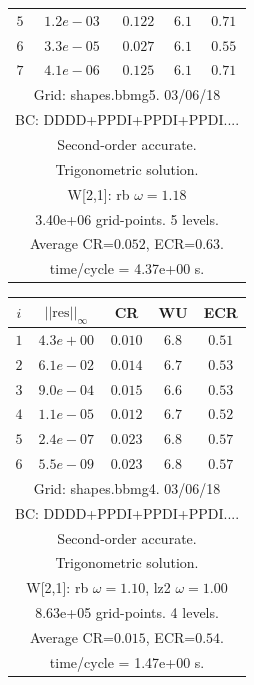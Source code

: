 \begin{table}[hbt]
\begin{center}
{\begin{tabular}{|c|c|c|c|c|}
 $ 5$  & $ 1.2e-03$ & $0.122$ & $ 6.1$ & $0.71$ \\ 
 $ 6$  & $ 3.3e-05$ & $0.027$ & $ 6.1$ & $0.55$ \\ 
 $ 7$  & $ 4.1e-06$ & $0.125$ & $ 6.1$ & $0.71$ \\ 
\hline 
\multicolumn{5}{|c|}{Grid: shapes.bbmg5. 03/06/18}  \\
\multicolumn{5}{|c|}{BC: DDDD+PPDI+PPDI+PPDI....}  \\
\multicolumn{5}{|c|}{Second-order accurate.}  \\
\multicolumn{5}{|c|}{Trigonometric solution.}  \\
\multicolumn{5}{|c|}{W[2,1]: rb $\omega=1.18$}  \\
\multicolumn{5}{|c|}{3.40e+06 grid-points. 5 levels.}  \\
\multicolumn{5}{|c|}{Average CR=$0.052$, ECR=$0.63$.}  \\
\multicolumn{5}{|c|}{time/cycle = 4.37e+00 s.}  \\
\hline 
\end{tabular}
\begin{tabular}{|c|c|c|c|c|} \hline 
 $i$   & $\vert\vert\mbox{res}\vert\vert_\infty$  &  CR     &  WU    & ECR  \\   \hline 
 $ 1$  & $ 4.3e+00$ & $0.010$ & $ 6.8$ & $0.51$ \\ 
 $ 2$  & $ 6.1e-02$ & $0.014$ & $ 6.7$ & $0.53$ \\ 
 $ 3$  & $ 9.0e-04$ & $0.015$ & $ 6.6$ & $0.53$ \\ 
 $ 4$  & $ 1.1e-05$ & $0.012$ & $ 6.7$ & $0.52$ \\ 
 $ 5$  & $ 2.4e-07$ & $0.023$ & $ 6.8$ & $0.57$ \\ 
 $ 6$  & $ 5.5e-09$ & $0.023$ & $ 6.8$ & $0.57$ \\ 
\hline 
\multicolumn{5}{|c|}{Grid: shapes.bbmg4. 03/06/18}  \\
\multicolumn{5}{|c|}{BC: DDDD+PPDI+PPDI+PPDI....}  \\
\multicolumn{5}{|c|}{Second-order accurate.}  \\
\multicolumn{5}{|c|}{Trigonometric solution.}  \\
\multicolumn{5}{|c|}{W[2,1]: rb $\omega=1.10$, lz2 $\omega=1.00$}  \\
\multicolumn{5}{|c|}{8.63e+05 grid-points. 4 levels.}  \\
\multicolumn{5}{|c|}{Average CR=$0.015$, ECR=$0.54$.}  \\
\multicolumn{5}{|c|}{time/cycle = 1.47e+00 s.}  \\

\end{tabular}}
\end{center}
\end{table}
